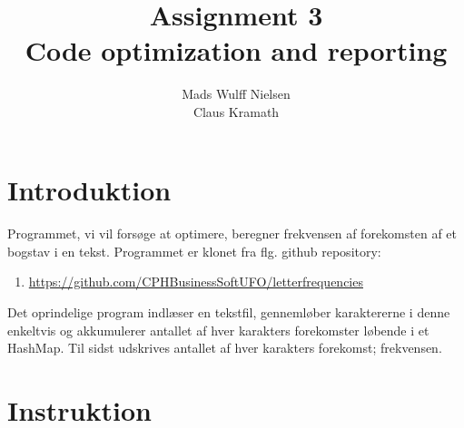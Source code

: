 \documentclass{article}
\title{%
Assignment 3 \\
\large Code optimization and reporting
}
\author{Mads Wulff Nielsen \\
Claus Kramath}
\begin{document}
\maketitle
\thispagestyle{empty}
\newpage
\tableofcontents
\thispagestyle{empty} 
\newpage
\section{Introduktion}
\paragraph{}
Programmet, vi vil forsøge at optimere, beregner frekvensen af forekomsten af et bogstav i en tekst. Programmet er klonet fra flg. github repository: 
\begin{enumerate}
    \item \url{https://github.com/CPHBusinessSoftUFO/letterfrequencies}
\end{enumerate}
Det oprindelige program indlæser en tekstfil, gennemløber karaktererne i denne enkeltvis og akkumulerer antallet af hver karakters forekomster løbende i et HashMap. Til sidst udskrives antallet af hver karakters forekomst; frekvensen.
\section{Instruktion}
\end{document}

